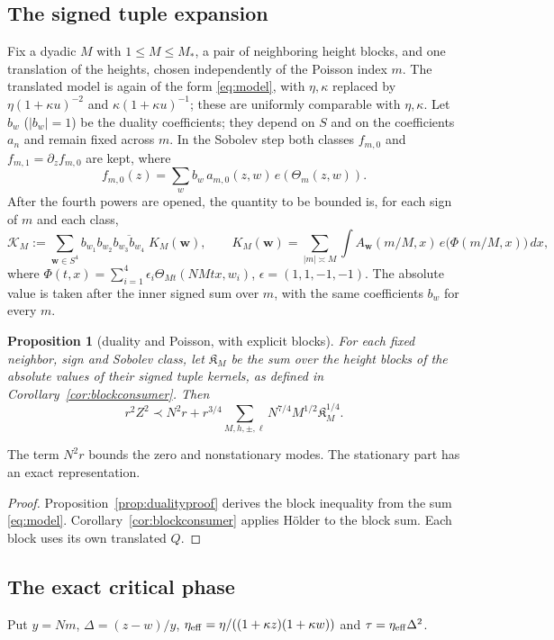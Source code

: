 \documentclass[11pt]{amsart}
\newtheorem{proposition}[theorem]{Proposition}
\theoremstyle{definition}
\theoremstyle{remark}
\numberwithin{equation}{section}
\newcommand{\cK}{\mathcal{K}}
\newcommand{\Mst}{M_{*}}
\begin{document}
\subsection{The signed tuple expansion}
Fix a dyadic $M$ with $1\le M\le\Mst$, a pair of neighboring height blocks, and one translation of the heights, chosen independently of the Poisson index $m$. The translated model is again of the form \eqref{eq:model}, with $\eta,\kappa$ replaced by $\eta(1+\kappa u)^{-2}$ and $\kappa(1+\kappa u)^{-1}$; these are uniformly comparable with $\eta,\kappa$. Let $b_w$ ($|b_w|=1$) be the duality coefficients; they depend on $S$ and on the coefficients $a_n$ and remain fixed across $m$. In the Sobolev step both classes $f_{m,0}$ and $f_{m,1}=\partial_zf_{m,0}$ are kept, where
\[
f_{m,0}(z)=\sum_wb_w\,a_{m,0}(z,w)\,e(\Theta_m(z,w)).
\]
After the fourth powers are opened, the quantity to be bounded is, for each sign of $m$ and each class,
\begin{equation}\label{eq:tuple}
\cK_M:=\sum_{\mathbf w\in S^4}b_{w_1}b_{w_2}\overline{b_{w_3}b_{w_4}}\;K_M(\mathbf w),\qquad
K_M(\mathbf w)=\sum_{|m|\asymp M}\int A_{\mathbf w}(m/M,x)\,e\big(\Phi(m/M,x)\big)\,dx,
\end{equation}
where $\Phi(t,x)=\sum_{i=1}^4\epsilon_i\Theta_{Mt}(NMtx,w_i)$, $\epsilon=(1,1,-1,-1)$. The absolute value is taken after the inner signed sum over $m$, with the same coefficients $b_w$ for every $m$.

\begin{proposition}[duality and Poisson, with explicit blocks]\label{in:duality}
For each fixed neighbor, sign and Sobolev class, let $\mathfrak K_M$ be the sum over the height blocks of the absolute values of their signed tuple kernels, as defined in Corollary~\ref{cor:blockconsumer}. Then
\begin{equation}\label{eq:duality}
r^2Z^2\prec N^2r+r^{3/4}\sum_{M,h,\pm,\ell}
N^{7/4}M^{1/2}\mathfrak K_M^{1/4}.
\end{equation}
\end{proposition}
The term $N^2r$ bounds the zero and nonstationary modes. The stationary part has an exact representation.
\begin{proof}
Proposition~\ref{prop:dualityproof} derives the block inequality from the sum \eqref{eq:model}. Corollary~\ref{cor:blockconsumer} applies H\"older to the block sum. Each block uses its own translated $Q$.
\end{proof}

\subsection{The exact critical phase}
Put $y=Nm$, $\Delta=(z-w)/y$, $\eta_{\rm eff}=\eta/((1+\kappa z)(1+\kappa w))$ and $\tau=\eta_{\rm eff}\Delta^2$.
\end{document}
